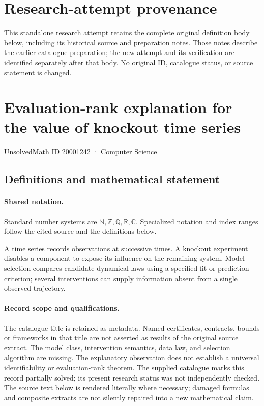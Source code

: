 \documentclass[11pt]{article}
\begin{document}
\section*{Research-attempt provenance}
This standalone research attempt retains the complete original definition body below,
including its historical source and preparation notes. Those notes describe the
earlier catalogue preparation; the new attempt and its verification are identified
separately after that body. No original ID, catalogue status, or source statement is changed.

\section{Evaluation-rank explanation for the value of knockout time series}\label{20001242}
{\small UnsolvedMath ID 20001242 · Computer Science}
\subsection{Definitions and mathematical statement}

\paragraph{Shared notation.}Standard number systems are $\mathbb N,\mathbb Z,\mathbb Q,\mathbb R,\mathbb C$. Specialized notation and index ranges follow the cited source and the definitions below.


A time series records observations at successive times. A knockout experiment disables a component to expose its influence on the remaining system. Model selection compares candidate dynamical laws using a specified fit or prediction criterion; several interventions can supply information absent from a single observed trajectory.
\paragraph{Record scope and qualifications.}
The catalogue title is retained as metadata. Named certificates, contracts, bounds or frameworks in that title are not asserted as results of the original source extract.
The model class, intervention semantics, data law, and selection algorithm are missing. The explanatory observation does not establish a universal identifiability or evaluation-rank theorem. The supplied catalogue marks this record partially solved; its present research status was not independently checked.
The source text below is rendered literally where necessary; damaged formulas and composite extracts are not silently repaired into a new mathematical claim.
\end{document}
